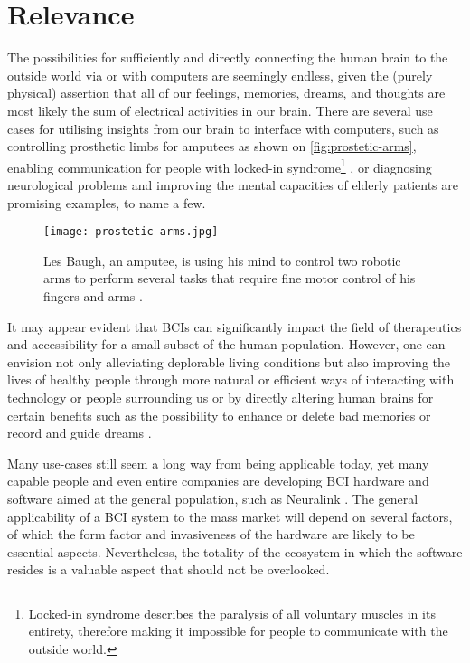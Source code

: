 \section{Relevance}
\label{chapter1-relevance}

The possibilities for sufficiently and directly connecting the human brain to the outside world via or with computers are seemingly endless, given the (purely physical) assertion that all of our feelings, memories, dreams, and thoughts are most likely the sum of electrical activities in our brain. There are several use cases for utilising insights from our brain to interface with computers, such as controlling prosthetic limbs for amputees \citep{campbell_amputee_2014} as shown on \autoref{fig:prostetic-arms}, enabling communication for people with locked-in syndrome\footnote{Locked-in syndrome describes the paralysis of all voluntary muscles in its entirety, therefore making it impossible for people to communicate with the outside world.} \citep{chaudhary_spelling_2022}, or diagnosing neurological problems and improving the mental capacities of elderly patients \citep{belkacem_brain_2020} are promising examples, to name a few.

\begin{figure}[ht]
  \centering
  \texttt{[image: prostetic-arms.jpg]}
  \caption[Les Baugh, an amputee, is using his mind to control two robotic arms to perform several tasks that require fine motor control of his fingers and arms]{Les Baugh, an amputee, is using his mind to control two robotic arms to perform several tasks that require fine motor control of his fingers and arms \citep{campbell_amputee_2014}.}
  \label{fig:prostetic-arms}
\end{figure}

It may appear evident that BCIs can significantly impact the field of therapeutics and accessibility for a small subset of the human population. However, one can envision not only alleviating deplorable living conditions but also improving the lives of healthy people through more natural or efficient ways of interacting with technology or people surrounding us or by directly altering human brains for certain benefits such as the possibility to enhance or delete bad memories \citep{spiers_enhance_2014} or record and guide dreams \citep{haar_horowitz_dormio_2020}.

Many use-cases still seem a long way from being applicable today, yet many capable people and even entire companies are developing BCI hardware and software aimed at the general population, such as Neuralink \citep{urban_neuralink_2017}. The general applicability of a BCI system to the mass market will depend on several factors, of which the form factor and invasiveness of the hardware are likely to be essential aspects. Nevertheless, the totality of the ecosystem in which the software resides is a valuable aspect that should not be overlooked.


